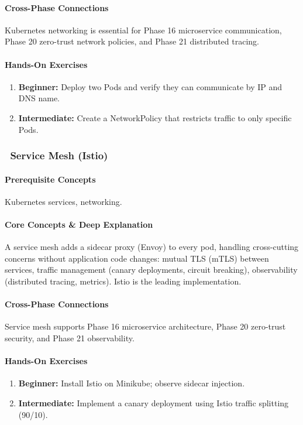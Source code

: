 \documentclass[11pt, a4paper, oneside]{report}
\newcommand{\awareness}[1]{\subsubsection{\texorpdfstring{\fcolorbox{gray!50}{gray!10}{\footnotesize\bfseries\color{gray!50!black} AWARENESS}~#1}{#1}}}
\begin{document}
\paragraph{Cross-Phase Connections} Kubernetes networking is essential for Phase 16 microservice communication, Phase 20 zero-trust network policies, and Phase 21 distributed tracing.

\paragraph{Hands-On Exercises}
\begin{enumerate}[leftmargin=*]
\item \textbf{Beginner:} Deploy two Pods and verify they can communicate by IP and DNS name.
\item \textbf{Intermediate:} Create a NetworkPolicy that restricts traffic to only specific Pods.
\end{enumerate}

\awareness{Service Mesh (Istio)}

\paragraph{Prerequisite Concepts} Kubernetes services, networking.

\paragraph{Core Concepts \& Deep Explanation} A service mesh adds a sidecar proxy (Envoy) to every pod, handling cross-cutting concerns without application code changes: mutual TLS (mTLS) between services, traffic management (canary deployments, circuit breaking), observability (distributed tracing, metrics). Istio is the leading implementation.

\paragraph{Cross-Phase Connections} Service mesh supports Phase 16 microservice architecture, Phase 20 zero-trust security, and Phase 21 observability.

\paragraph{Hands-On Exercises}
\begin{enumerate}[leftmargin=*]
\item \textbf{Beginner:} Install Istio on Minikube; observe sidecar injection.
\item \textbf{Intermediate:} Implement a canary deployment using Istio traffic splitting (90/10).
\end{enumerate}
\end{document}

